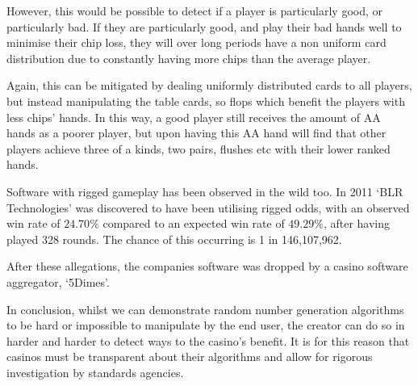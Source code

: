 However, this would be possible to detect if a player is particularly good, or
particularly bad. If they are particularly good, and play their bad hands well
to minimise their chip loss, they will over long periods have a non uniform
card distribution due to constantly having more chips than the average player.

Again, this can be mitigated by dealing uniformly distributed cards to all
players, but instead manipulating the table cards, so flops which benefit
the players with less chips' hands. In this way, a good player still receives
the amount of AA hands as a poorer player, but upon having this AA hand will
find that other players achieve three of a kinds, two pairs, flushes etc
with their lower ranked hands.

Software with rigged gameplay has been observed in the wild too. In 2011 
`BLR Technologies' was discovered to have been utilising rigged odds, with an 
observed win rate of $24.70\%$ compared to an expected win rate of $49.29\%$,
after having played 328 rounds. The chance of this occurring is 1 in 
146,107,962. \parencite{website:shackleford2011}

After these allegations, the companies software was dropped by a casino software
aggregator, `5Dimes'.

In conclusion, whilst we can demonstrate random number generation algorithms
to be hard or impossible to manipulate by the end user, the creator can do so
in harder and harder to detect ways to the casino's benefit. It is for this
reason that casinos must be transparent about their algorithms and allow
for rigorous investigation by standards agencies.
